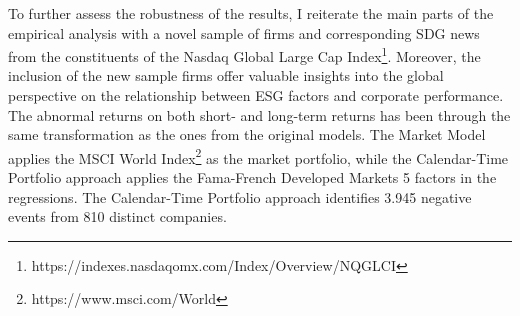 To further assess the robustness of the results, I reiterate the main parts of the empirical analysis with a novel sample of firms and corresponding SDG news from the constituents of the Nasdaq Global Large Cap Index\footnote{https://indexes.nasdaqomx.com/Index/Overview/NQGLCI}. Moreover, the inclusion of the new sample firms offer valuable insights into the global perspective on the relationship between ESG factors and corporate performance. The abnormal returns on both short- and long-term returns has been through the same transformation as the ones from the original models. The Market Model applies the MSCI World Index\footnote{https://www.msci.com/World} as the market portfolio, while the Calendar-Time Portfolio approach applies the Fama-French Developed Markets 5 factors in the regressions. The Calendar-Time Portfolio approach identifies 3.945 negative events from 810 distinct companies. 

